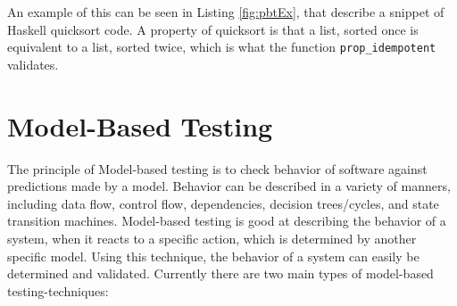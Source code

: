 An example of this can be seen in Listing \ref{fig:pbtEx}, that describe a snippet of Haskell quicksort code. A property of quicksort is that a list, sorted once is equivalent to a list, sorted twice, which is what the function \lstinline{prop_idempotent} validates.

\section{Model-Based Testing}

The principle of Model-based testing is to check behavior of software against predictions made by a model. Behavior can be described in a variety of manners, including data flow, control flow, dependencies, decision trees/cycles, and state transition machines. Model-based testing is good at describing the behavior of a system, when it reacts to a specific action, which is determined by another specific model. Using this technique, the behavior of a system can easily be determined and validated. Currently there are two main types of model-based testing-techniques:

